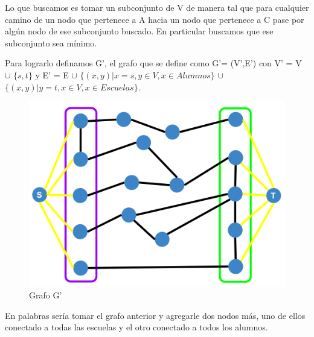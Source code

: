 Lo que buscamos es tomar un subconjunto de V de manera tal que para cualquier camino de un nodo que pertenece a A hacia un nodo que pertenece a C pase por algún nodo de ese subconjunto buscado. En particular buscamos que ese subconjunto sea mínimo.

Para lograrlo definamos G', el grafo que se define como G'= (V',E') con V' = V $\cup$ $\{s,t\}$ y E' = E $\cup$ $\{(x,y)| x = s, y \in V , x \in Alumnos \}$ $\cup$ $\{(x,y)| y = t, x \in V , x \in Escuelas \}$.

\begin{figure}[h!]
  \centering
    \includegraphics[scale = 0.225]{img/gprima.png}
    \caption{Grafo G'}
\end{figure}

En palabras sería tomar el grafo anterior y agregarle dos nodos más, uno de ellos conectado a todas las escuelas y el otro conectado a todos los alumnos.


